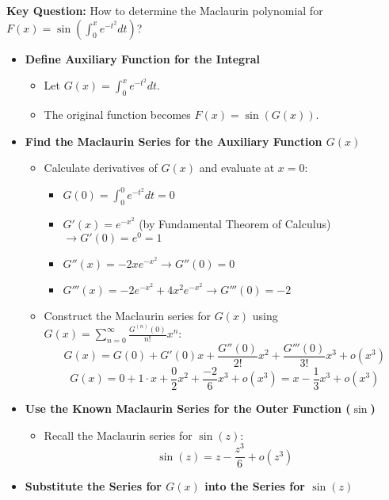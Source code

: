 \begin{cascade}
	\textbf{Key Question:} How to determine the Maclaurin polynomial for $F(x) = \sin\left(\int_0^x e^{-t^2} dt\right)$?
	\begin{itemize}
		\item \textbf{Define Auxiliary Function for the Integral}
		      \begin{itemize}
			      \item Let $G(x) = \int_0^x e^{-t^2} dt$.
			      \item The original function becomes $F(x) = \sin(G(x))$.
		      \end{itemize}
		\item \textbf{Find the Maclaurin Series for the Auxiliary Function $G(x)$}
		      \begin{itemize}
			      \item Calculate derivatives of $G(x)$ and evaluate at $x=0$:
			            \begin{itemize}
				            \item $G(0) = \int_0^0 e^{-t^2} dt = 0$
				            \item $G'(x) = e^{-x^2}$ (by Fundamental Theorem of Calculus) $\rightarrow G'(0) = e^0 = 1$
				            \item $G''(x) = -2x e^{-x^2} \rightarrow G''(0) = 0$
				            \item $G'''(x) = -2e^{-x^2} + 4x^2 e^{-x^2} \rightarrow G'''(0) = -2$
			            \end{itemize}
			      \item Construct the Maclaurin series for $G(x)$ using $G(x) = \sum_{n=0}^{\infty} \frac{G^{(n)}(0)}{n!}x^n$:
			            \[ G(x) = G(0) + G'(0)x + \frac{G''(0)}{2!}x^2 + \frac{G'''(0)}{3!}x^3 + o(x^3) \]
			            \[ G(x) = 0 + 1 \cdot x + \frac{0}{2}x^2 + \frac{-2}{6}x^3 + o(x^3) = x - \frac{1}{3}x^3 + o(x^3) \]
		      \end{itemize}
		\item \textbf{Use the Known Maclaurin Series for the Outer Function ($\sin$)}
		      \begin{itemize}
			      \item Recall the Maclaurin series for $\sin(z)$:
			            \[ \sin(z) = z - \frac{z^3}{6} + o(z^3) \]
		      \end{itemize}
		\item \textbf{Substitute the Series for $G(x)$ into the Series for $\sin(z)$}
		      \begin{itemize}

\end{itemize}
\end{itemize}
\end{cascade}
